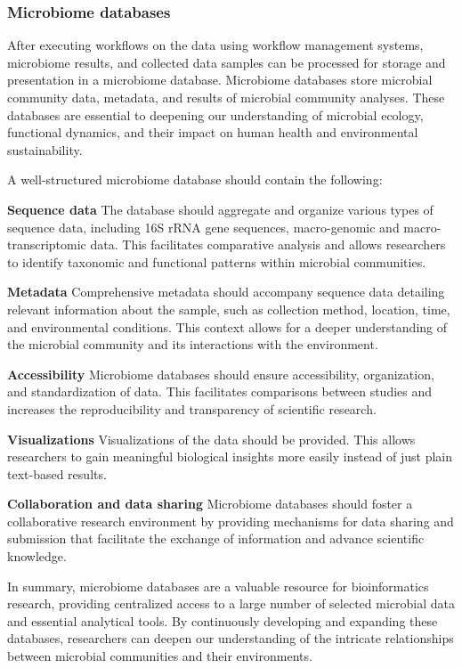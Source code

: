         \subsubsection{Microbiome databases}

           After executing workflows on the data using workflow management systems, microbiome results, and collected data samples can be processed for storage and presentation in a microbiome database. Microbiome databases store microbial community data, metadata, and results of microbial community analyses. These databases are essential to deepening our understanding of microbial ecology, functional dynamics, and their impact on human health and environmental sustainability.
    
            A well-structured microbiome database should contain the following:

            \textbf{Sequence data}
                The database should aggregate and organize various types of sequence data, including 16S rRNA gene sequences, macro-genomic and macro-transcriptomic data. This facilitates comparative analysis and allows researchers to identify taxonomic and functional patterns within microbial communities.
    
            \textbf{Metadata}
                Comprehensive metadata should accompany sequence data detailing relevant information about the sample, such as collection method, location, time, and environmental conditions. This context allows for a deeper understanding of the microbial community and its interactions with the environment.

            \textbf{Accessibility}
                Microbiome databases should ensure accessibility, organization, and standardization of data. This facilitates comparisons between studies and increases the reproducibility and transparency of scientific research.
    
            \textbf{Visualizations}
                Visualizations of the data should be provided. This allows researchers to gain meaningful biological insights more easily instead of just plain text-based results.
    
            \textbf{Collaboration and data sharing}
                Microbiome databases should foster a collaborative research environment by providing mechanisms for data sharing and submission that facilitate the exchange of information and advance scientific knowledge.
            
                In summary, microbiome databases are a valuable resource for bioinformatics research, providing centralized access to a large number of selected microbial data and essential analytical tools. By continuously developing and expanding these databases, researchers can deepen our understanding of the intricate relationships between microbial communities and their environments.

